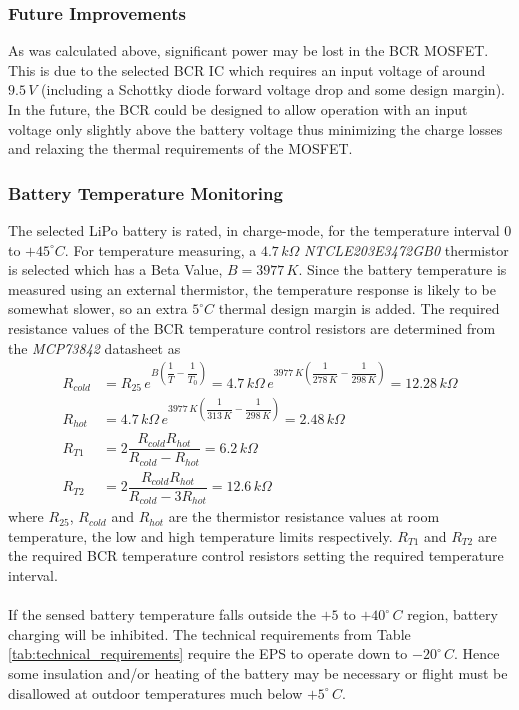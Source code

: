 \subsubsection*{Future Improvements}
As was calculated above, significant power may be lost in the \ac{BCR} \ac{MOSFET}. This is due to the selected \ac{BCR} \ac{IC} which requires an input voltage of around $9.5\,V$ (including a Schottky diode forward voltage drop and some design margin). In the future, the \ac{BCR} could be designed to allow operation with an input voltage only slightly above the battery voltage thus minimizing the charge losses and relaxing the thermal requirements of the \ac{MOSFET}.
%
%
\subsubsection{Battery Temperature Monitoring}
The selected \ac{LiPo} battery is rated, in charge-mode, for the temperature interval $0$ to $+45^{\circ}C$. For temperature measuring, a $4.7\,k \Omega$ \textit{NTCLE203E3472GB0} thermistor is selected which has a Beta Value, $B=3977\,K$. Since the battery temperature is measured using an external thermistor, the temperature response is likely to be somewhat slower, so an extra $5^{\circ}C$ thermal design margin is added. The required resistance values of the \ac{BCR} temperature control resistors are determined from the \textit{MCP73842} datasheet as 
%
\begin{equation}
\begin{split}
R_{cold}&=R_{25}\,e^{B(\dfrac{1}{T}-\dfrac{1}{T_0})}=4.7\,k\Omega \,e^{3977\,K(\dfrac{1}{278	\,K}-\dfrac{1}{298\,K})}=12.28\,k\Omega\\
R_{hot}&=4.7\,k\Omega \, e^{3977\,K(\dfrac{1}{313	\,K}-\dfrac{1}{298\,K})}=2.48\,k\Omega\\
R_{T1}&=2\dfrac{R_{cold}R_{hot}}{R_{cold}-R_{hot}}=6.2\,k\Omega\\
R_{T2}&=2\dfrac{R_{cold}R_{hot}}{R_{cold}-3R_{hot}}=12.6\,k\Omega
\end{split}
\end{equation}
%
where $R_{25}$, $R_{cold}$ and $R_{hot}$ are the thermistor resistance values at room temperature, the low and high temperature limits respectively. $R_{T1}$ and $R_{T2}$ are the required \ac{BCR} temperature control resistors setting the required temperature interval.
\\
\\
If the sensed battery temperature falls outside the $+5$ to $+40^{\circ}\,C$ region, battery charging will be inhibited. The technical requirements from Table \ref{tab:technical_requirements} require the \ac{EPS} to operate down to $-20^{\circ}\,C$. Hence some insulation and/or heating of the battery may be necessary or flight must be disallowed at outdoor temperatures much below $+5^{\circ}\,C$.
%
